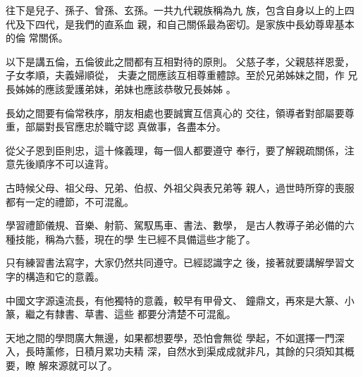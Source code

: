 \documentclass[avery5371,grid]{flashcards}
\begin{document}
{往下是兒子、孫子、曾孫、玄孫。一共九代親族稱為九
族，包含自身以上的上四代及下四代，是我們的直系血
親，和自己關係最為密切。是家族中長幼尊卑基本的倫
常關係。} %
{} %


{以下是講五倫，五倫彼此之間都有互相對待的原則。
父慈子孝，父親慈祥恩愛，子女孝順，夫義婦順從，
夫妻之間應該互相尊重體諒。至於兄弟姊妹之間，作
兄長姊姊的應該愛護弟妹，弟妹也應該恭敬兄長姊姊
。} %
{} %


{長幼之間要有倫常秩序，朋友相處也要誠實互信真心的
交往，領導者對部屬要尊重，部屬對長官應忠於職守認
真做事，各盡本分。} %
{} %


{從父子恩到臣則忠，這十條義理，每一個人都要遵守
奉行，要了解親疏關係，注意先後順序不可以違背。} %
{} %


{古時候父母、祖父母、兄弟、伯叔、外祖父與表兄弟等
親人，過世時所穿的喪服都有一定的禮節，不可混亂。} %
{} %

{學習禮節儀規、音樂、射箭、駕馭馬車、書法、數學，
是古人教導子弟必備的六種技能，稱為六藝，現在的學
生已經不具備這些才能了。} %
{} %





{只有練習書法寫字，大家仍然共同遵守。已經認識字之
後，接著就要講解學習文字的構造和它的意義。} %
{} %

{中國文字源遠流長，有他獨特的意義，較早有甲骨文、
鐘鼎文，再來是大篆、小篆，繼之有隸書、草書、這些
都要分清楚不可混亂。} %
{} %

{天地之間的學問廣大無邊，如果都想要學，恐怕會無從
學起，不如選擇一門深入，長時薰修，日積月累功夫精
深，自然水到渠成成就非凡，其餘的只須知其概要，瞭
解來源就可以了。} %
{} %
\end{document}
